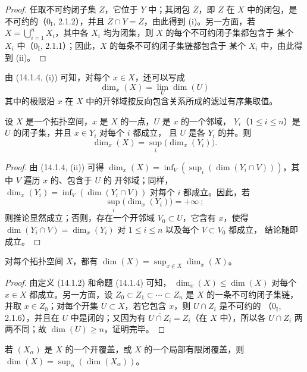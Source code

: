 \begin{proof}
任取不可约闭子集 $Z$，它位于 $Y$ 中；其闭包 $\overline Z$，即 $Z$ 在
$X$ 中的闭包，是不可约的（$0_{\mathrm I}$, 2.1.2），并且
$\overline Z\cap Y=Z$，由此得到 (i)。另一方面，若
$X=\bigcup_{i=1}^n X_i$，其中各 $X_i$ 均为闭集，则 $X$ 的每个不可约闭子集都包含于
某个 $X_i$ 中（$0_{\mathrm I}$, 2.1.1）；因此，$X$ 的每条不可约闭子集链都包含于
某个 $X_i$ 中，由此得到 (ii)。
\end{proof}

由 (14.1.4, (i)) 可知，对每个 $x\in X$，还可以写成
\[
  \dim_x(X)=\lim_U\dim(U)
  \tag{14.1.4.1}\label{0.14.1.4.1-fr}
\]
其中的极限沿 $x$ 在 $X$ 中的开邻域按反向包含关系所成的滤过有序集取值。

\begin{corollary}[14.1.5]
\label{0.14.1.5-fr}
设 $X$ 是一个拓扑空间，$x$ 是 $X$ 的一点，$U$ 是 $x$ 的一个邻域，
$Y_i$（$1\leq i\leq n$）是 $U$ 的闭子集，并且 $x\in Y_i$ 对每个 $i$ 都成立，
且 $U$ 是各 $Y_i$ 的并。则
\[
  \dim_x(X)=\sup_i\bigl(\dim_x(Y_i)\bigr).
  \tag{14.1.5.1}\label{0.14.1.5.1-fr}
\]
\end{corollary}

\begin{proof}
由 (14.1.4, (ii)) 可得
$\dim_x(X)=\inf_V(\sup_i(\dim(Y_i\cap V)))$，其中 $V$ 遍历 $x$ 的、包含于 $U$ 的
开邻域；同样，$\dim_x(Y_i)=\inf_V(\dim(Y_i\cap V))$ 对每个 $i$ 都成立。因此，若
\[
  \sup_i\bigl(\dim_x(Y_i)\bigr)=+\infty~;
\]
则推论显然成立；否则，存在一个开邻域 $V_0\subset U$，它含有 $x$，使得
$\dim(Y_i\cap V)=\dim_x(Y_i)$ 对 $1\leq i\leq n$ 以及每个 $V\subset V_0$ 都成立，
结论随即成立。
\end{proof}

\begin{proposition}[14.1.6]
\label{0.14.1.6-fr}
对每个拓扑空间 $X$，都有
$\dim(X)=\sup_{x\in X}\dim_x(X)$。
\end{proposition}

\begin{proof}
由定义 (14.1.2) 和命题 (14.1.4) 可知，
$\dim_x(X)\leq\dim(X)$ 对每个 $x\in X$ 都成立。另一方面，设
$Z_0\subset Z_1\subset\cdots\subset Z_n$ 是 $X$ 的一条不可约闭子集链，并取
$x\in Z_0$；对每个开集 $U\subset X$，若它包含 $x$，则 $U\cap Z_i$ 是不可约的
（$0_{\mathrm I}$, 2.1.6），并且在 $U$ 中是闭的；又因为有
$\overline{U\cap Z_i}=Z_i$（在 $X$ 中），所以各 $U\cap Z_i$ 两两不同；故
$\dim(U)\geq n$，证明完毕。
\end{proof}

\begin{corollary}[14.1.7]
\label{0.14.1.7-fr}
若 $(X_\alpha)$ 是 $X$ 的一个开覆盖，或 $X$ 的一个局部有限闭覆盖，则
$\dim(X)=\sup_\alpha(\dim(X_\alpha))$。
\end{corollary}


